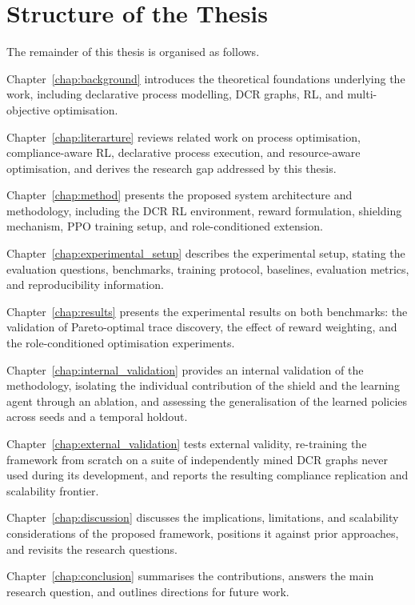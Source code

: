 \section{Structure of the Thesis}
\label{sec:structure_thesis}

The remainder of this thesis is organised as follows.

Chapter~\ref{chap:background} introduces the theoretical foundations
underlying the work, including declarative process modelling, \ac{DCR}
graphs, \ac{RL}, and multi-objective optimisation.

Chapter~\ref{chap:literarture} reviews related work on process
optimisation, compliance-aware \ac{RL}, declarative process execution,
and resource-aware optimisation, and derives the research gap addressed
by this thesis.

Chapter~\ref{chap:method} presents the proposed system architecture and
methodology, including the \ac{DCR} \ac{RL} environment, reward
formulation, shielding mechanism, \ac{PPO} training setup, and
role-conditioned extension.

Chapter~\ref{chap:experimental_setup} describes the experimental setup,
stating the evaluation questions, benchmarks, training protocol,
baselines, evaluation metrics, and reproducibility information.

Chapter~\ref{chap:results} presents the experimental results on both
benchmarks: the validation of Pareto-optimal trace discovery, the effect
of reward weighting, and the role-conditioned optimisation experiments.

Chapter~\ref{chap:internal_validation} provides an internal validation
of the methodology, isolating the individual contribution of the shield
and the learning agent through an ablation, and assessing the
generalisation of the learned policies across seeds and a temporal
holdout.

Chapter~\ref{chap:external_validation} tests external validity,
re-training the framework from scratch on a suite of independently mined
\ac{DCR} graphs never used during its development, and reports the
resulting compliance replication and scalability frontier.

Chapter~\ref{chap:discussion} discusses the implications, limitations,
and scalability considerations of the proposed framework, positions it
against prior approaches, and revisits the research questions.

Chapter~\ref{chap:conclusion} summarises the contributions, answers the
main research question, and outlines directions for future work.
